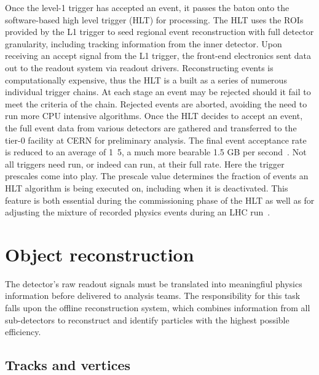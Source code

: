 Once the level-1 trigger has accepted an event, it passes the baton onto the software-based high level trigger (HLT) for processing. The HLT uses the ROIs provided by the L1 trigger to seed regional event reconstruction with full detector granularity, including tracking information from the inner detector. Upon receiving an accept signal from the L1 trigger, the front-end electronics sent data out to the readout system via readout drivers. Reconstructing events is computationally expensive, thus the HLT is a built as a series of numerous individual trigger chains. At each stage an event may be rejected should it fail to meet the criteria of the chain. Rejected events are aborted, avoiding the need to run more CPU intensive algorithms. Once the HLT decides to accept an event, the full event data from various detectors are gathered and transferred to the tier-0 facility at CERN for preliminary analysis. The final event acceptance rate is reduced to an average of \unit{1.5}{\kilo\hertz}, a much more bearable 1.5 GB per second~\cite{zurNedden:2238679}. Not all triggers need run, or indeed can run, at their full rate. Here the trigger prescales come into play. The prescale value determines the fraction of events an HLT algorithm is being executed on, including when it is deactivated. This feature is both essential during the commissioning phase of the HLT as well as for adjusting the mixture of recorded physics events during an LHC run~\cite{Winklmeier}. 

\section{Object reconstruction}

The \ATLAS detector's raw readout signals must be translated into meaningfiul physics information before delivered to analysis teams. The responsibility for this task falls upon the offline reconstruction system, which combines information from all sub-detectors to reconstruct and identify particles with the highest possible efficiency. 

\subsection{Tracks and vertices}
\label{ssec:tracksandvertices}

